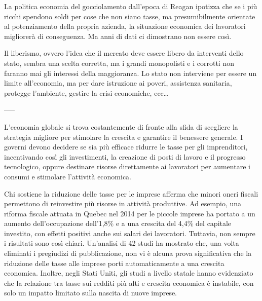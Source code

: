 \documentclass[12pt]{book} %
\begin{document}
\bigskip

La politica economia del gocciolamento dall'epoca di Reagan ipotizza che se i più ricchi spendono
soldi per cose che non siano tasse, ma presumibilmente orientate al potenziamento della propria azienda, la situazione
economica dei lavoratori migliorerà di conseguenza. Ma anni di dati ci dimostrano non essere
così.


\bigskip

Il liberismo, ovvero l'idea che il mercato deve essere libero da interventi dello stato, sembra una
scelta corretta, ma i grandi monopolisti e i corrotti non faranno mai gli interessi della maggioranza. Lo stato non
interviene per essere un limite all'economia, ma per dare istruzione ai poveri, assistenza
sanitaria, protegge l'ambiente, gestire la crisi economiche, ecc… 

-----

L'economia globale si trova costantemente di fronte alla sfida di scegliere la strategia migliore per stimolare la crescita e garantire il benessere generale. I governi devono decidere se sia più efficace ridurre le tasse per gli imprenditori, incentivando così gli investimenti, la creazione di posti di lavoro e il progresso tecnologico, oppure destinare risorse direttamente ai lavoratori per aumentare i consumi e stimolare l'attività economica.

Chi sostiene la riduzione delle tasse per le imprese afferma che minori oneri fiscali permettono di reinvestire più risorse in attività produttive. Ad esempio, una riforma fiscale attuata in Quebec nel 2014 per le piccole imprese ha portato a un aumento dell'occupazione dell'1,8\% e a una crescita del 4,4\% del capitale investito, con effetti positivi anche sui salari dei lavoratori. Tuttavia, non sempre i risultati sono così chiari. Un'analisi di 42 studi ha mostrato che, una volta eliminati i pregiudizi di pubblicazione, non vi è alcuna prova significativa che la riduzione delle tasse alle imprese porti automaticamente a una crescita economica. Inoltre, negli Stati Uniti, gli studi a livello statale hanno evidenziato che la relazione tra tasse sui redditi più alti e crescita economica è instabile, con solo un impatto limitato sulla nascita di nuove imprese.
\end{document}
